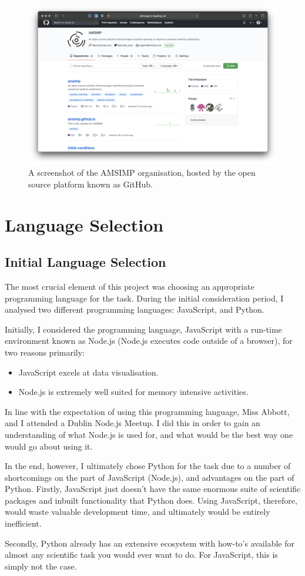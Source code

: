 \begin{figure}[H]
    \centering
    \includegraphics[width=.8\linewidth]{Images/github}
    \caption{A screenshot of the AMSIMP organisation, hosted by the open source platform known as GitHub.}
    \label{github}
\end{figure}

\section{Language Selection}
\subsection{Initial Language Selection}
The most crucial element of this project was choosing an appropriate programming language for the task. During the initial consideration period, I analysed two different programming languages: JavaScript, and Python\cite{python}. 

Initially, I considered the programming language, JavaScript with a run-time environment known as Node.js (Node.js executes code outside of a browser), for two reasons primarily:

\begin{itemize}
    \item JavaScript excels at data visualisation.
    \item Node.js is extremely well suited for memory intensive activities.
\end{itemize}

In line with the expectation of using this programming language, Miss Abbott, and I attended a Dublin Node.js Meetup. I did this in order to gain an understanding of what Node.js is used for, and what would be the best way one would go about using it. 

In the end, however, I ultimately chose Python for the task due to a number of shortcomings on the part of JavaScript (Node.js), and advantages on the part of Python. Firstly, JavaScript just doesn’t have the same enormous suite of scientific packages and inbuilt functionality that Python does. Using JavaScript, therefore, would waste valuable development time, and ultimately would be entirely inefficient.

Secondly, Python already has an extensive ecosystem with how-to’s available for almost any scientific task you would ever want to do. For JavaScript, this is simply not the case.\cite{javascript_vs_python}


